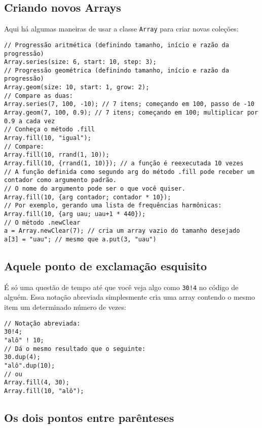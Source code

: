 \subsection{Criando novos Arrays}

Aqui há algumas maneiras de usar a classe \texttt{Array} para criar novas coleções:

\begin{lstlisting}[style=SuperCollider-IDE, basicstyle=\scttfamily\footnotesize]
// Progressão aritmética (definindo tamanho, início e razão da progressão)
Array.series(size: 6, start: 10, step: 3);
// Progressão geométrica (definindo tamanho, início e razão da progressão)
Array.geom(size: 10, start: 1, grow: 2);
// Compare as duas:
Array.series(7, 100, -10); // 7 itens; começando em 100, passo de -10
Array.geom(7, 100, 0.9); // 7 itens; começando em 100; multiplicar por 0.9 a cada vez
// Conheça o método .fill
Array.fill(10, "igual");
// Compare:
Array.fill(10, rrand(1, 10)); 
Array.fill(10, {rrand(1, 10)}); // a função é reexecutada 10 vezes
// A função definida como segundo arg do método .fill pode receber um contador como argumento padrão.
// O nome do argumento pode ser o que você quiser.
Array.fill(10, {arg contador; contador * 10});
// Por exemplo, gerando uma lista de frequências harmônicas:
Array.fill(10, {arg uau; uau+1 * 440}); 
// O método .newClear
a = Array.newClear(7); // cria um array vazio do tamanho desejado
a[3] = "uau"; // mesmo que a.put(3, "uau")
\end{lstlisting}


\subsection{Aquele ponto de exclamação esquisito}

É só uma questão de tempo até que você veja algo como \texttt{30!4} no código de alguém. Essa notação abreviada simplesmente cria uma array contendo o mesmo item um determinado número de vezes:

 
\begin{lstlisting}[style=SuperCollider-IDE, basicstyle=\scttfamily\footnotesize]
// Notação abreviada:
30!4;
"alô" ! 10;
// Dá o mesmo resultado que o seguinte:
30.dup(4);
"alô".dup(10);
// ou
Array.fill(4, 30);
Array.fill(10, "alô");
\end{lstlisting}
 

\subsection{Os dois pontos entre parênteses}

